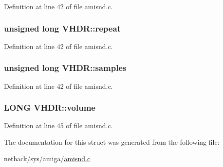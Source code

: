 Definition at line 42 of file amisnd.\+c.

\hypertarget{structVHDR_a6f7ae2c860bb3158b73bfd5dc687453d}{
\subsubsection[{repeat}]{\setlength{\rightskip}{0pt plus 5cm}unsigned long V\+H\+D\+R\+::repeat}}\label{structVHDR_a6f7ae2c860bb3158b73bfd5dc687453d}


Definition at line 42 of file amisnd.\+c.

\hypertarget{structVHDR_a7a18a51c2ae695acc4be0c2a8507b8eb}{
\subsubsection[{samples}]{\setlength{\rightskip}{0pt plus 5cm}unsigned long V\+H\+D\+R\+::samples}}\label{structVHDR_a7a18a51c2ae695acc4be0c2a8507b8eb}


Definition at line 42 of file amisnd.\+c.

\hypertarget{structVHDR_a0af145fc440467469fe9bf80fd7ea1aa}{
\subsubsection[{volume}]{\setlength{\rightskip}{0pt plus 5cm}L\+O\+N\+G V\+H\+D\+R\+::volume}}\label{structVHDR_a0af145fc440467469fe9bf80fd7ea1aa}


Definition at line 45 of file amisnd.\+c.



The documentation for this struct was generated from the following file\+:\begin{DoxyCompactItemize}
\item 
nethack/sys/amiga/\hyperlink{amisnd_8c}{amisnd.\+c}\end{DoxyCompactItemize}
